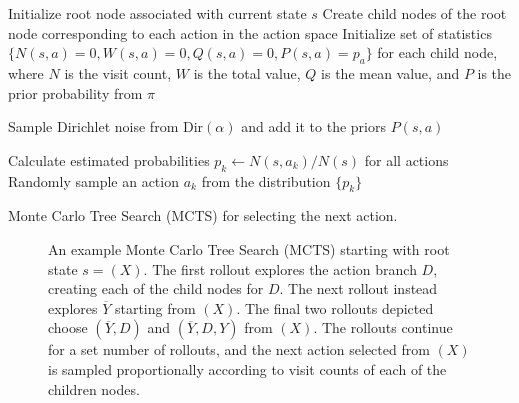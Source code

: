 \begin{algorithm}[H]
\BlankLine
Initialize root node associated with current state $s$ \;
Create child nodes of the root node corresponding to each action in the action space \;
Initialize set of statistics $\{ N(s,a)=0, W(s,a)=0, Q(s,a)=0, P(s,a)= p_a \}$ for each child node, where $N$ is the visit count, $W$ is the total value, $Q$ is the mean value, and $P$ is the prior probability from $\pi$ \;

Sample Dirichlet noise from $\text{Dir}(\alpha)$ and add it to the priors $P(s, a)$ \;

Calculate estimated probabilities $p_k \leftarrow N(s, a_k) / N(s)$ for all actions \;
Randomly sample an action $a_k$ from the distribution $\{ p_k \}$ \;

\caption{Monte Carlo Tree Search (MCTS) for selecting the next action. \label{al:mcts}}
\end{algorithm}

\begin{figure}[H]
    \centering
    
    \caption{An example Monte Carlo Tree Search (MCTS) starting with root state $s = (X)$. The first rollout explores the action branch $D$, creating each of the child nodes for $D$. The next rollout instead explores $\overline{Y}$ starting from $(X)$. The final two rollouts depicted choose $(\overline{Y}, D)$ and $(\overline{Y}, D, Y)$ from $(X)$. The rollouts continue for a set number of rollouts, and the next action selected from $(X)$ is sampled proportionally according to visit counts of each of the children nodes.}
    \label{fig:mcts}
\end{figure}

